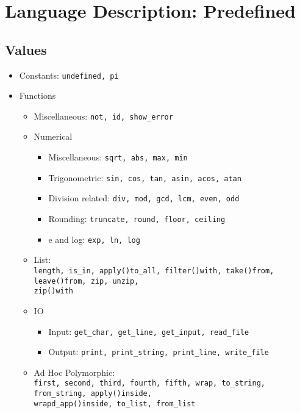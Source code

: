 \documentclass{article}
\begin{document}
\section{Language Description: Predefined}

\subsection{Values}

\begin{itemize}

\item Constants: \texttt{undefined, pi}

\item Functions
  \begin{itemize}

  \item Miscellaneous: \texttt{not, id, show_error}

  \item Numerical
    \begin{itemize}
    \item Miscellaneous: \texttt{sqrt, abs, max, min}
    \item Trigonometric: \texttt{sin, cos, tan, asin, acos, atan}
    \item Division related: \texttt{div, mod, gcd, lcm, even, odd}
    \item Rounding: \texttt{truncate, round, floor, ceiling}
    \item e and log: \texttt{exp, ln, log}
    \end{itemize}

  \item List:\\
    \texttt{length, is_in, apply()to_all, filter()with, take()from, leave()from,
    zip, unzip,\\ zip()with}

  \item IO
    \begin{itemize}
    \item Input: \texttt{get_char, get_line, get_input, read_file}
    \item Output: \texttt{print, print_string, print_line, write_file}
    \end{itemize}

  \item Ad Hoc Polymorphic:\\
  \texttt{first, second, third, fourth, fifth, wrap, to_string, from_string,
  apply()inside, \\wrapd_app()inside, to_list, from_list}

  \end{itemize}
\end{itemize}
\end{document}
